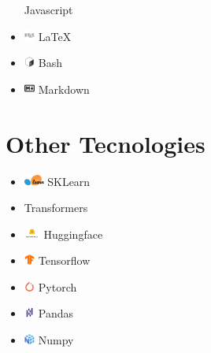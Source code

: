 \documentclass{article}
\begin{document}
\begin{multicols}{3}
\begin{itemize}
    Javascript
    \item \includegraphics[height=10pt]{images/icons/latex-original.png} LaTeX
    \item \includegraphics[height=10pt]{images/icons/bash-original.png} Bash
    \item \includegraphics[height=10pt]{images/icons/markdown-original.png} Markdown
\end{itemize}

\section*{Other Tecnologies}
\begin{itemize}
    \item \includegraphics[height=10pt]{images/icons/sklearn.png} SKLearn
    \item Transformers
    \item \includegraphics[height=10pt]{images/icons/huggingface.png} Huggingface
    \item \includegraphics[height=10pt]{images/icons/tensorflow-original.png} Tensorflow
    \item \includegraphics[height=10pt]{images/icons/pytorch-original.png} Pytorch
    \item \includegraphics[height=10pt]{images/icons/pandas-original.png} Pandas
    \item \includegraphics[height=10pt]{images/icons/numpy-original.png} Numpy

\end{itemize}
\end{multicols}
\end{document}
